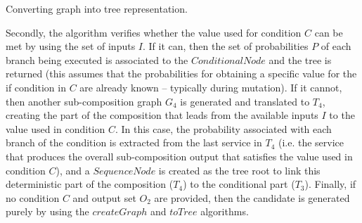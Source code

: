 \begin{algorithm}
 \setlength{}
 \LinesNumbered
 \SetNlSty{}{}{:}
 \vspace{2mm}
 \caption{\footnotesize Converting graph into tree representation.}
\label{toTree}
\end{algorithm} 

Secondly, the algorithm verifies whether the value used for condition $C$ can be met by using the set of inputs $I$. If it can, then the set of probabilities $P$ of each branch being executed is associated to the $ConditionalNode$ and the tree is returned (this assumes that the probabilities for obtaining a specific value for the if condition in $C$ are already known -- typically during mutation). If it cannot, then another sub-composition graph $G_4$ is generated and translated to $T_4$, creating the part of the composition that leads from the available inputs $I$ to the value used in condition $C$. In this case, the probability associated with each branch of the condition is extracted from the last service in $T_4$ (i.e. the service that produces the overall sub-composition output that satisfies the value used in condition $C$), and a $SequenceNode$ is created as the tree root to link this deterministic part of the composition ($T_4$) to the conditional part ($T_3$). Finally, if no condition $C$ and output set $O_2$ are provided, then the candidate is generated purely by using the $createGraph$ and $toTree$ algorithms. 

